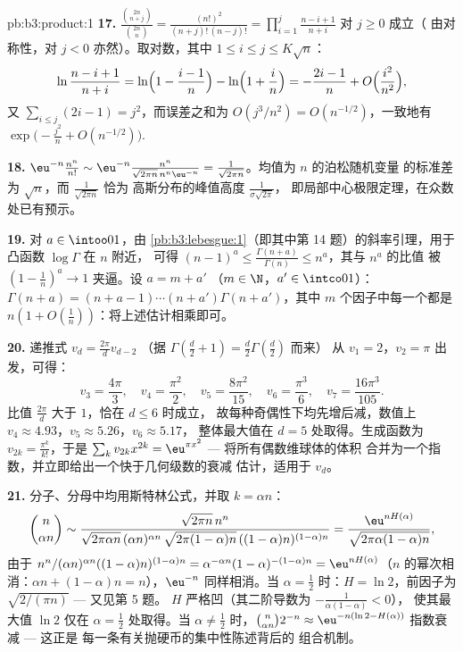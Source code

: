 \begin{solution}{pb:b3:product:1}
\textbf{17.} $\frac{\binom{2n}{n+j}}{\binom{2n}n} =
\frac{(n!)^2}{(n+j)!\,(n-j)!} =
\prod_{i=1}^{j}\frac{n-i+1}{n+i}$ 对 $j \geq 0$ 成立（
由对称性，对 $j < 0$ 亦然）。取对数，其中 $1 \leq i
\leq j \leq K\sqrt n$：
\[
\ln\frac{n-i+1}{n+i} = \ln\Bigl(1 - \frac{i-1}n\Bigr) -
\ln\Bigl(1 + \frac in\Bigr) = -\frac{2i-1}{n} +
O\Bigl(\frac{i^2}{n^2}\Bigr),
\]
又 $\sum_{i\leq j}(2i - 1) = j^2$，而误差之和为
$O(j^3/n^2) = O(n^{-1/2})$，一致地有
$\exp\bigl(-\frac{j^2}n + O(n^{-1/2})\bigr)$.

\textbf{18.} $\eu^{-n}\frac{n^n}{n!} \sim \eu^{-n}
\frac{n^n}{\sqrt{2\pi n}\,n^n\eu^{-n}} =
\frac1{\sqrt{2\pi n}}$。均值为 $n$ 的泊松随机变量
的标准差为 $\sqrt n$，而 $\frac1{\sqrt{2\pi n}}$ 恰为
高斯分布的峰值高度 $\frac1{\sigma\sqrt{2\pi}}$，
即局部中心极限定理，在众数处已有预示。

\textbf{19.} 对 $a \in \intoo01$，由
\cref{pb:b3:lebesgue:1}（即其中第 14 题）的斜率引理，用于凸函数 $\log\Gamma$ 在 $n$ 附近，
可得 $(n-1)^a \leq
\frac{\Gamma(n+a)}{\Gamma(n)} \leq n^a$，其与 $n^a$ 的比值
被 $(1 - \frac1n)^a \to 1$ 夹逼。设 $a = m + a'$
（$m \in \N$，$a' \in \intco01$）：$\Gamma(n+a) = (n + a - 1)
\cdots(n + a')\Gamma(n + a')$，其中 $m$ 个因子中每一个都是
$n(1 + O(\frac1n))$：将上述估计相乘即可。

\textbf{20.} 递推式 $v_d = \frac{2\pi}dv_{d-2}$
（据 $\Gamma(\frac d2 + 1) = \frac d2\Gamma(\frac d2)$ 而来）
从 $v_1 = 2$，$v_2 = \pi$ 出发，可得：
\[
v_3 = \frac{4\pi}3,\quad v_4 = \frac{\pi^2}2,\quad
v_5 = \frac{8\pi^2}{15},\quad v_6 = \frac{\pi^3}6,\quad
v_7 = \frac{16\pi^3}{105}.
\]
比值 $\frac{2\pi}d$ 大于 $1$，恰在 $d \leq 6$ 时成立，
故每种奇偶性下均先增后减，数值上 $v_4
\approx 4.93$，$v_5 \approx 5.26$，$v_6 \approx 5.17$，
整体最大值在 $d = 5$ 处取得。生成函数为 $v_{2k} =
\frac{\pi^k}{k!}$，于是 $\sum_kv_{2k}x^{2k} =
\eu^{\pi x^2}$ --- 将所有偶数维球体的体积
合并为一个指数，并立即给出一个快于几何级数的衰减
估计，适用于 $v_d$。

\textbf{21.} 分子、分母中均用斯特林公式，并取 $k =
\alpha n$：
\[
\binom n{\alpha n} \sim
\frac{\sqrt{2\pi n}\,n^n}
{\sqrt{2\pi\alpha n}\,(\alpha n)^{\alpha n}\,
\sqrt{2\pi(1-\alpha)n}\,((1-\alpha)n)^{(1-\alpha)n}}
= \frac{\eu^{nH(\alpha)}}{\sqrt{2\pi\alpha(1-\alpha)n}},
\]
由于 $n^n/(\alpha n)^{\alpha n}((1-\alpha)n)^{(1-\alpha)n} =
\alpha^{-\alpha n}(1-\alpha)^{-(1-\alpha)n} =
\eu^{nH(\alpha)}$（$n$ 的幂次相消：$\alpha n +
(1-\alpha)n = n$），$\eu^{-n}$ 同样相消。当
$\alpha = \frac12$ 时：$H = \ln2$，前因子为
$\sqrt{2/(\pi n)}$ --- 又见第 5 题。
$H$ 严格凹（其二阶导数为 $-\frac1{\alpha(1-\alpha)} < 0$），
使其最大值 $\ln 2$ 仅在 $\alpha = \frac12$ 处取得。当
$\alpha \neq \frac12$ 时，$\binom n{\alpha n}2^{-n} \approx
\eu^{-n(\ln2 - H(\alpha))}$ 指数衰减 --- 这正是
每一条有关抛硬币的集中性陈述背后的
组合机制。


\end{solution}
